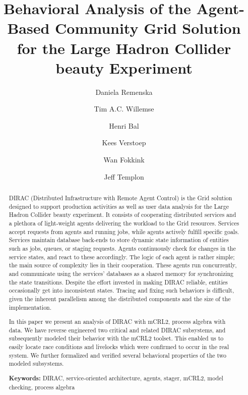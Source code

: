 \documentclass[10pt,conference]{IEEEtran}
\begin{document}
\title{Behavioral Analysis of the Agent-Based Community Grid Solution for the Large Hadron Collider beauty Experiment}
\author[1,3]{Daniela Remenska}
\author[2]{Tim A.C. Willemse}
\author[1]{Henri Bal}
\author[1]{Kees Verstoep}
\author[1]{Wan Fokkink}
\author[3]{Jeff Templon}



\maketitle

\begin{abstract}
DIRAC (Distributed Infrastructure with Remote Agent Control) is the Grid
solution designed to support production activities as well as user data analysis
for the Large Hadron Collider beauty experiment. It consists of cooperating
distributed services and a plethora of light-weight agents delivering the
workload to the Grid resources.  Services accept requests from agents and
running jobs, while agents actively fulfill specific goals. Services maintain
database back-ends to store dynamic state information of entities such as jobs,
queues, or staging requests. Agents continuously check for changes in the
service states, and react to these accordingly. The logic of each agent is
rather simple; the main source of complexity lies in their cooperation. These
agents run concurrently, and communicate using the services' databases as a
shared memory for synchronizing the state transitions. Despite the effort
invested in making DIRAC reliable, entities occasionally get into inconsistent
states. Tracing and fixing such behaviors is difficult, given the inherent
parallelism among the distributed components and the size of the
implementation.

In this paper we present an analysis of DIRAC with mCRL2, process algebra with
data. We have reverse engineered two critical and related DIRAC subsystems, and
subsequently modeled their behavior with the mCRL2 toolset. This enabled us to
easily locate race conditions and livelocks which were confirmed to occur in the
real system. We further formalized and verified several behavioral properties of
the two modeled subsystems.

\textbf{Keywords:} DIRAC, service-oriented architecture, agents, stager,
mCRL2,  model checking,  process algebra

\end{abstract}
\end{document}

